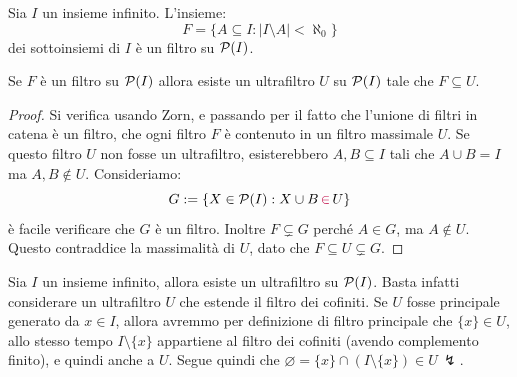 \begin{example}
    Sia $I$ un insieme infinito. L'insieme:
    \[ F = \{ A \subseteq I : |I \setminus A| < \aleph_0 \}\]
    dei sottoinsiemi  di $I$ è un filtro su $\mathcal{P}(I)$.
\end{example}

\begin{proposition}
    Se $F$ è un filtro su $\mathcal{P}(I)$ allora esiste un ultrafiltro $U$ su $\mathcal{P}(I)$ tale che $F \subseteq U$.
\end{proposition}

\begin{proof}
    Si verifica usando Zorn, e passando per il fatto che l'unione di filtri in catena è un filtro, che ogni filtro $F$ è contenuto in un filtro massimale $U$.
    Se questo filtro $U$ non fosse un ultrafiltro, esisterebbero $A,B \subseteq I$ tali che $A \cup B = I$ ma $A, B \notin U$. Consideriamo:
    \[ G := \{ X \in \mathcal{P}(I) : X \cup B \,\textcolor{purple}{\in}\, U\}
    \]
    è facile verificare che $G$ è un filtro. Inoltre $F \subsetneq G$ perché $A \in G$, ma $A \notin U$. Questo contraddice la massimalità di $U$, dato che $F \subseteq U \subsetneq G$.
\end{proof}

\begin{example}
    Sia $I$ un insieme infinito, allora esiste un ultrafiltro  su $\mathcal{P}(I)$. Basta infatti considerare 
    un ultrafiltro $U$ che estende il filtro dei cofiniti. Se $U$ fosse principale generato da $x \in I$, allora avremmo per definizione di filtro principale che $\{x\} \in U$,
    allo stesso tempo $I \setminus \{x\}$ appartiene al filtro dei cofiniti (avendo complemento finito), e quindi anche a $U$. Segue quindi che $\varnothing = \{x\} \cap (I \setminus \{x\}) \in U \,\lightning$.
\end{example}

